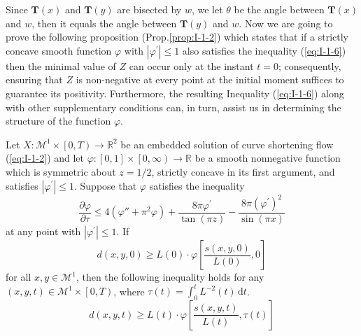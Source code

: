Since $\mathbf{T}(x)$ and $\mathbf{T}(y)$ are bisected by $w$, we let $\theta$ be the angle between $\mathbf{T}(x)$ and $w$, then it equals the angle between $\mathbf{T}(y)$ and $w$. Now we are going to prove the following proposition (Prop.\ref{prop:I-1-2}) which states that if a strictly concave smooth function $\varphi$ with $\left|\varphi^\prime\right|\le1$ also satisfies the inequality (\ref{eq:I-1-6}) then the minimal value of $Z$ can occur only at the instant $t=0$; consequently, ensuring that $Z$ is non-negative at every point at the initial moment suffices to guarantee its positivity. Furthermore, the resulting Inequality (\ref{eq:I-1-6}) along with other supplementary conditions can, in turn, assist us in determining the structure of the function $\varphi$.

\begin{proposition}\label{prop:I-1-2}
    Let $X:\mathcal{M}^1\times\left[0,T\right)\to\mathbb{R}^2$ be an embedded solution of curve shortening flow (\ref{eq:I-1-2}) and let $\varphi:\left[0,1\right]\times\left[0,\infty\right)\to\mathbb{R}$ be a smooth nonnegative function which is symmetric about $z=1/2$, strictly concave in its first argument, and satisfies $\left|\varphi^\prime\right|\le 1$. Suppose that $\varphi$ satisfies the inequality
    \begin{equation}\label{eq:I-1-6}
        \frac{\partial\varphi}{\partial\tau}\le 4\left(\varphi{''}+\pi^2\varphi\right)+\frac{8\pi\varphi^\prime}{\tan{(\pi z)}}-\frac{8\pi{\left(\varphi^\prime\right)}^2}{\sin{\left(\pi x\right)}}
    \end{equation}
    at any point with $\left|\varphi^\prime\right|\le 1$. If
    \begin{equation}\label{eq:I-1-13}
        d(x,y,0)\ge L(0)\cdot\varphi\left[\frac{s(x,y,0)}{L(0)},0\right]
    \end{equation}
    for all $x,y\in\mathcal{M}^1$, then the following inequality holds for any $(x,y,t)\in\mathcal{M}^1\times\left[0,T\right)$, where $\tau(t)=\int_{0}^{t}L^{-2}(t)\,\mathrm{d}t$.
    \begin{equation*}
        d(x,y,t)\ge L(t)\cdot\varphi\left[\frac{s(x,y,t)}{L(t)},\tau(t)\right]
    \end{equation*}
\end{proposition}

